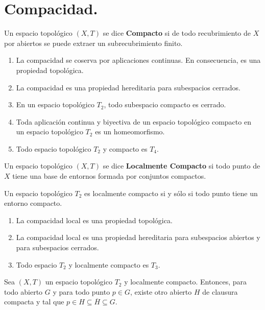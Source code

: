 \documentclass[cursovd_portada.tex]{subfiles}
\begin{document}
\section{Compacidad.}
\begin{defi}
Un espacio topológico $(X,T)$ se dice {\bf Compacto} si de todo recubrimiento de $X$ por abiertos se puede extraer
un subrecubrimiento finito.
\end{defi}
\begin{prop}
\begin{enumerate}
\item La compacidad se coserva por aplicaciones continuas. En consecuencia, es una propiedad topológica.
\item La compacidad es una propiedad hereditaria para subespacios cerrados.
\item En un espacio topológico $T_2$, todo subespacio compacto es cerrado.
\item Toda aplicación continua y biyectiva de un espacio topológico compacto en un espacio topológico $T_2$ es un
homeomorfismo.
\item Todo espacio topológico $T_2$ y compacto es $T_4$.
\end{enumerate}
\end{prop}
\begin{defi}
Un espacio topológico $(X,T)$ se dice {\bf Localmente Compacto} si todo punto de $X$ tiene una base de entornos
formada por conjuntos compactos.
\end{defi}
\begin{teorema}
Un espacio topológico $T_2$ es localmente compacto si y sólo si todo punto tiene un entorno compacto.
\end{teorema}
\begin{prop}
\begin{enumerate}
\item La compacidad local es una propiedad topológica.
\item La compacidad local es una propiedad hereditaria para subespacios abiertos y para subespacios cerrados.
\item Todo espacio $T_2$ y localmente compacto es $T_3$.
\end{enumerate}
\end{prop}
\begin{prop}
Sea $(X,T)$ un espacio topológico $T_2$ y localmente compacto. Entonces, para todo abierto $G$ y para todo punto
$p\in G$, existe otro abierto $H$ de clausura compacta y tal que $p\in H\subseteq\overline{H}\subseteq G$.
\end{prop}
\end{document}

